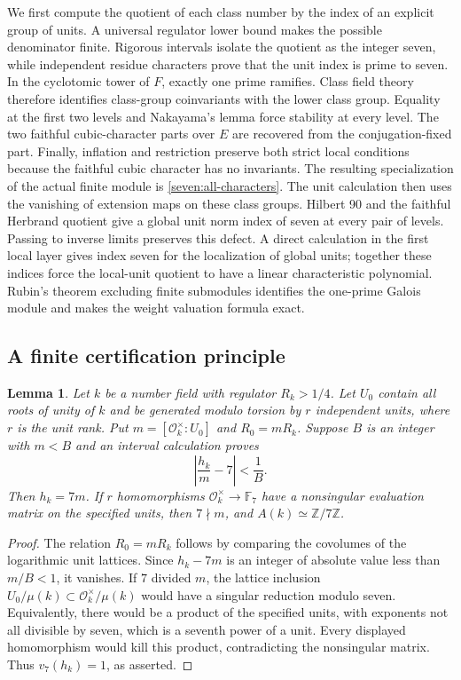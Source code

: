 \documentclass[11pt]{article}
\newtheorem{lemma}[theorem]{Lemma}
\begin{document}
We first compute the quotient of each class number by the index of an
explicit group of units. A universal regulator lower bound makes the
possible denominator finite. Rigorous intervals isolate the quotient as
the integer seven, while independent residue characters prove that the
unit index is prime to seven. In the cyclotomic tower of $F$, exactly one
prime ramifies. Class field theory therefore identifies class-group
coinvariants with the lower class group. Equality at the first two levels
and Nakayama's lemma force stability at every level. The two faithful
cubic-character parts over $E$ are recovered from the conjugation-fixed
part. Finally, inflation and restriction preserve both strict local
conditions because the faithful cubic character has no invariants.
The resulting specialization of the actual finite module is
\eqref{seven:all-characters}. The unit calculation then uses the vanishing of extension maps on these class groups. Hilbert 90 and the faithful Herbrand quotient give a global unit norm index of seven at every pair of levels. Passing to inverse limits preserves this defect. A direct calculation in the first local layer gives index seven for the localization of global units; together these indices force the local-unit quotient to have a linear characteristic polynomial. Rubin's theorem excluding finite submodules identifies the one-prime Galois module and makes the weight valuation formula exact.

\subsection{A finite certification principle}
\label{seven:finite-principle}

\begin{lemma}\label{seven:isolation}
Let $k$ be a number field with regulator $R_k>1/4$. Let $U_0$ contain all
roots of unity of $k$ and be generated modulo torsion by $r$ independent
units, where $r$ is the unit rank. Put
$m=[\mathcal O_k^\times:U_0]$ and $R_0=mR_k$.
Suppose $B$ is an integer with $m<B$ and an interval calculation proves
\[
 \left|\frac{h_k}{m}-7\right|<\frac1B.
 \tag{S5}\label{seven:isolation-bound}
\]
Then $h_k=7m$. If $r$ homomorphisms
$\mathcal O_k^\times\longrightarrow\mathbb F_7$ have a nonsingular
evaluation matrix on the specified units, then $7\nmid m$, and
$A(k)\simeq\mathbb Z/7\mathbb Z$.
\end{lemma}

\begin{proof}
The relation $R_0=mR_k$ follows by comparing the covolumes of the logarithmic
unit lattices. Since $h_k-7m$ is an integer of absolute value less than
$m/B<1$, it vanishes. If $7$ divided $m$, the lattice inclusion
$U_0/\mu(k)\subset\mathcal O_k^\times/\mu(k)$ would have a singular
reduction modulo seven. Equivalently, there would be a product of the
specified units, with exponents not all divisible by seven, which is a
seventh power of a unit. Every displayed homomorphism would kill this
product, contradicting the nonsingular matrix. Thus
$v_7(h_k)=1$, as asserted.
\end{proof}
\end{document}
